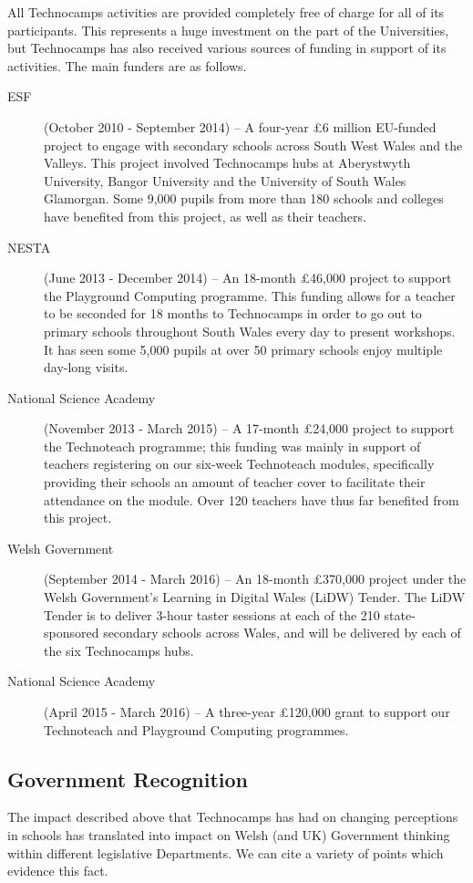 \documentclass{sig-alternate}
\begin{document}
All Technocamps activities are provided completely free of charge
for all of its participants. This represents a huge investment
on the part of the Universities, but Technocamps has also received
various sources of funding in support of its activities.
The main funders are as follows.
\begin{description}
\item[ESF] (October 2010 - September 2014) --
A four-year \pounds 6 million EU-funded project to engage with secondary schools across South West Wales and the Valleys. This project involved Technocamps hubs at Aberystwyth University, Bangor University and the University of South Wales Glamorgan. Some 9,000 pupils from more than 180 schools and colleges have benefited from this project, as well as their teachers.
\item[NESTA] (June 2013 - December 2014) --
An 18-month \pounds 46,000 project to support the Playground Computing programme. This funding allows for a teacher to be seconded for 18 months to Technocamps in order to go out to primary schools throughout South Wales every day to present workshops. It has seen some 5,000 pupils at over 50 primary schools enjoy multiple day-long visits.
\item[National Science Academy] (November 2013 - March 2015) --
A 17-month \pounds 24,000 project to support the Technoteach programme; this funding was mainly in support of teachers registering on our six-week Technoteach modules, specifically providing their schools an amount of teacher cover to facilitate their attendance on the module. Over 120 teachers have thus far benefited from this project.
\item[Welsh Government] (September 2014 - March 2016) --
An 18-month \pounds 370,000 project under the Welsh Government's Learning in Digital Wales (LiDW) Tender. The LiDW Tender is to deliver 3-hour taster sessions at each of the 210 state-sponsored secondary schools across Wales, and will be delivered by each of the six Technocamps hubs.
\item[National Science Academy] (April 2015 - March 2016) --
A three-year \pounds 120,000 grant to support our Technoteach and
Playground Computing programmes.
\end{description}

\subsection{Government Recognition}

The impact described above that
Technocamps has had on changing perceptions in schools
has translated into impact on Welsh (and UK) Government thinking
within different legislative Departments.
We can cite a variety of points which evidence this fact.
\end{document}
